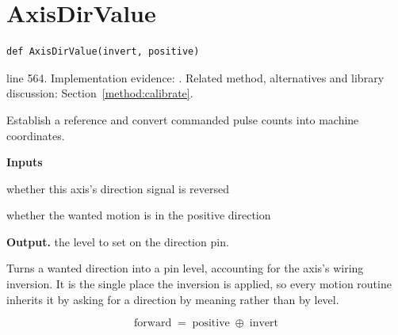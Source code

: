 \section{AxisDirValue}\label{fn:reproduce:AxisDirValue}
\begin{lstlisting}[style=sig]
def AxisDirValue(invert, positive)
\end{lstlisting}
 line 564. Implementation evidence: \cite{code2026}. Related method, alternatives and library discussion: Section~\ref{method:calibrate}.


Establish a reference and convert commanded pulse counts into machine coordinates.




\noindent\textbf{Inputs}
\begin{description}[leftmargin=2.2em,style=nextline,font=\normalfont\ttfamily]\setlength\itemsep{1pt}
  \item[{invert}] \normalfont whether this axis's direction signal is reversed
  \item[{positive}] \normalfont whether the wanted motion is in the positive direction
\end{description}

\noindent\textbf{Output.} the level to set on the direction pin.


Turns a wanted direction into a pin level, accounting for the axis's wiring inversion. It is the single place the inversion is applied, so every motion routine inherits it by asking for a direction by meaning rather than by level.


\begin{equation}
\mathrm{forward} \;=\; \mathrm{positive} \;\oplus\; \mathrm{invert}
\end{equation}


